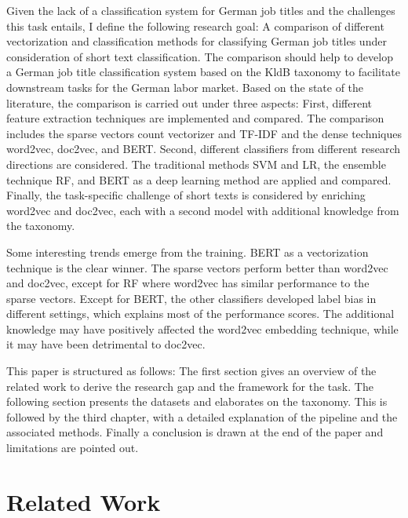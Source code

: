 \documentclass[12pt, a4paper, titlepage]{article}
\begin{document}
Given the lack of a classification system for German job titles and the challenges this task entails, I define the following research goal: A comparison of different vectorization and classification methods for classifying German job titles under consideration of short text classification. The comparison should help to develop a German job title classification system based on the \ac{KldB} taxonomy to facilitate downstream tasks for the German labor market. Based on the state of the literature, the comparison is carried out under three aspects: First, different feature extraction techniques are implemented and compared. The comparison includes the sparse vectors count vectorizer and \ac{TF-IDF} and the dense techniques word2vec, doc2vec, and BERT. Second, different classifiers from different research directions are considered. The traditional methods SVM and LR, the ensemble technique RF, and BERT as a deep learning method are applied and compared. Finally, the task-specific challenge of short texts is considered by enriching word2vec and doc2vec, each with a second model with additional knowledge from the taxonomy. 

Some interesting trends emerge from the training. \ac{BERT} as a vectorization technique is the clear winner. The sparse vectors perform better than word2vec and doc2vec, except for \ac{RF} where word2vec has similar performance to the sparse vectors. Except for \ac{BERT}, the other classifiers developed label bias in different settings, which explains most of the performance scores. The additional knowledge may have positively affected the word2vec embedding technique, while it may have been detrimental to doc2vec. 

This paper is structured as follows: The first section gives an overview of the related work to derive the research gap and the framework for the task. The following section presents the datasets and elaborates on the taxonomy. This is followed by the third chapter, with a detailed explanation of the pipeline and the associated methods. Finally a conclusion is drawn at the end of the paper and limitations are pointed out. 

\section{Related Work}
\end{document}
